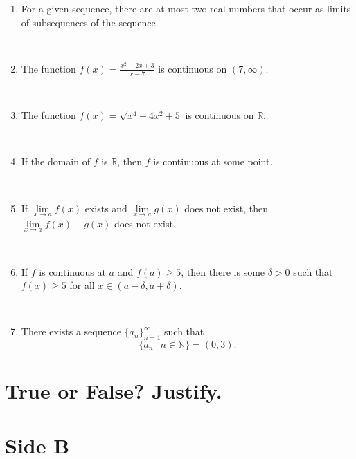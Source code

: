 \documentclass[12pt]{amsart}
\newcommand{\R}{{\mathbb{R}}}
\newcommand{\N}{\mathbb{N}}
\numberwithin{equation}{section}
\theoremstyle{plain} %
\theoremstyle{definition}
\theoremstyle{remark}
\begin{document}
\begin{enumerate}
\

 \item  For a given sequence, there are at most two real numbers that occur as limits of subsequences of the sequence.
 
 \

 	 \item  The function $\displaystyle f(x) = \frac{x^2 - 2x + 3}{x-7}$ is continuous on $(7,\infty)$.
	 
	 \
	
	 \item  The function $f(x) = \sqrt{ x^4 + 4x^2 +5}$ is continuous on $\R$.
	 
	 \
	 
	 	 \item  If the domain of $f$ is $\R$, then $f$ is continuous at some point.
	 
	 \	
	 
	 		\item If $\lim\limits_{x\to a} f(x)$ exists and $\lim\limits_{x\to a} g(x)$ does not exist, then $\lim\limits_{x\to a} f(x) + g(x)$ does not exist.
	
	\
	 
	 	 \item  If $f$ is continuous at $a$ and $f(a) \geq 5$, then there is some $\delta>0$ such that $f(x)\geq 5 $ for all $x\in (a-\delta,a+\delta)$.
	 
	 \
	 
	 
	 
	 	 \item There exists a sequence $\{a_n\}_{n=1}^\infty$ such that 
	 \[ \{ a_n \ | \ n\in \N \} = (0,3).\]
	 
	 

		\end{enumerate}
		
		
		
		\newpage
		
		\thispagestyle{empty}
		\section*{\large True or False? Justify.}

\medskip
		
		\section*{Side B}
		
\end{document}
